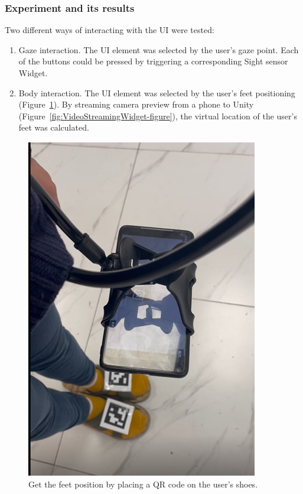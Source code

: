 \subsubsection{Experiment and its results}

Two different ways of interacting with the UI were tested:
\begin{enumerate}
    \item Gaze interaction. The UI element was selected by the user's gaze point. Each of the buttons could be pressed by triggering a corresponding Sight sensor Widget.
    \item Body interaction. The UI element was selected by the user's feet positioning (Figure~\ref{fig:Project11_1-figure}). By streaming camera preview from a phone to Unity (Figure~\ref{fig:VideoStreamingWidget-figure}), the virtual location of the user's feet was calculated.
\end{enumerate}

\begin{figure}
  \centering
  \includegraphics[width=0.6\linewidth]{figures/Project_11_1.png}
  \caption{Get the feet position by placing a QR code on the user's shoes.}
  \label{fig:Project11_1-figure}
\end{figure}

